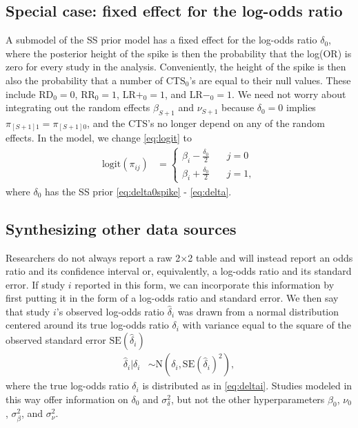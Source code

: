 \documentclass[AMA,STIX1COL]{WileyNJD-v2}
\begin{document}
\subsection{Special case: fixed effect for the log-odds ratio}

A submodel of the SS prior model has a fixed effect for the log-odds ratio $\delta_0$, where the posterior height of the spike is then the probability that the log(OR) is zero for every study in the analysis. Conveniently, the height of the spike is then also the probability that a number of $\mbox{CTS}_0$'s are equal to their null values. These include $\mbox{RD}_0 = 0$, $\mbox{RR}_0 = 1$, $\mbox{LR}+_0 = 1$, and $\mbox{LR}-_0 = 1$. We need not worry about integrating out the random effects $\beta_{S+1}$ and $\nu_{S+1}$ because $\delta_0 = 0$ implies $\pi_{[S+1]1} = \pi_{[S+1]0}$, and the CTS's no longer depend on any of the random effects. In the model, we change \eqref{eq:logit} to 
\begin{align}
\mbox{logit}(\pi_{ij}) & =  \left\{
                  \begin{array}{ll}
                    \beta_{i} - \frac{\delta_0}{2} & \quad j=0 \\ 
                    \beta_{i} + \frac{\delta_0}{2} & \quad j=1,
                  \end{array}
                \right. \label{eq:fixed_logit}
\end{align}
where $\delta_0$ has the SS prior \eqref{eq:delta0spike} - \eqref{eq:delta}.

\subsection{Synthesizing other data sources} \label{sec:synthesis}

Researchers do not always report a raw 2$\times$2 table and will instead report an odds ratio and its confidence interval or, equivalently, a log-odds ratio and its standard error. If study $i$ reported in this form, we can incorporate this information by first putting it in the form of a log-odds ratio and standard error. We then say that study $i$'s observed log-odds ratio $\widehat{\delta}_i$ was drawn from a normal distribution centered around its true log-odds ratio $\delta_i$ with variance equal to the square of the observed standard error $\mbox{SE}(\widehat{\delta}_i)$
\begin{align}
\widehat{\delta}_i \vert \delta_i &\sim \mbox{N}(\delta_i, \mbox{SE}(\widehat{\delta}_i)^2), \label{eq:deltahat} 
\end{align}
where the true log-odds ratio $\delta_i$ is distributed as in \eqref{eq:deltai}. Studies modeled in this way offer information on $\delta_0$ and $\sigma^2_\delta$, but not the other hyperparameters $\beta_0$, $\nu_0$, $\sigma^2_\beta$, and $\sigma^2_\nu$. 
\end{document}
